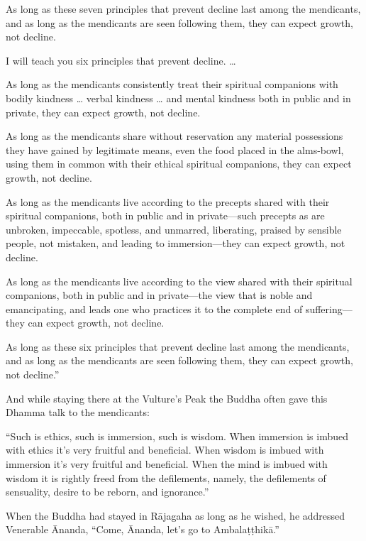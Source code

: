\documentclass[12pt,openany]{book}%
\begin{document}
As long as these seven principles that prevent decline last among the mendicants, and as long as the mendicants are seen following them, they can expect growth, not decline. 

I will teach you six principles that prevent decline. … 

As long as the mendicants consistently treat their spiritual companions with bodily kindness … verbal kindness … and mental kindness both in public and in private, they can expect growth, not decline. 

As long as the mendicants share without reservation any material possessions they have gained by legitimate means, even the food placed in the alms-bowl, using them in common with their ethical spiritual companions, they can expect growth, not decline. 

As long as the mendicants live according to the precepts shared with their spiritual companions, both in public and in private—such precepts as are unbroken, impeccable, spotless, and unmarred, liberating, praised by sensible people, not mistaken, and leading to immersion—they can expect growth, not decline. 

As long as the mendicants live according to the view shared with their spiritual companions, both in public and in private—the view that is noble and emancipating, and leads one who practices it to the complete end of suffering—they can expect growth, not decline. 

As long as these six principles that prevent decline last among the mendicants, and as long as the mendicants are seen following them, they can expect growth, not decline.” 

And while staying there at the Vulture’s Peak the Buddha often gave this Dhamma talk to the mendicants: 

“Such is ethics, such is immersion, such is wisdom. When immersion is imbued with ethics it’s very fruitful and beneficial. When wisdom is imbued with immersion it’s very fruitful and beneficial. When the mind is imbued with wisdom it is rightly freed from the defilements, namely, the defilements of sensuality, desire to be reborn, and ignorance.” 

When the Buddha had stayed in \textsanskrit{Rājagaha} as long as he wished, he addressed Venerable Ānanda, “Come, Ānanda, let’s go to \textsanskrit{Ambalaṭṭhikā}.” 
\end{document}
